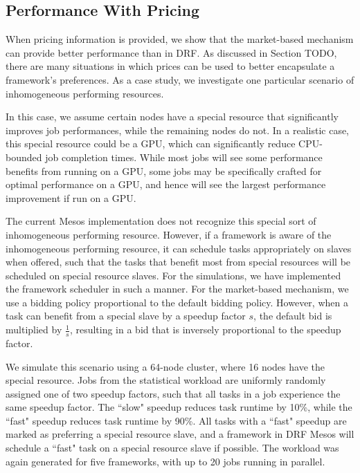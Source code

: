 \documentclass{acm_proc_article-sp}
\begin{document}
\subsection{Performance With Pricing\\}

When pricing information is provided, we show that the market-based mechanism can provide better performance than in DRF. As discussed in Section TODO, there are many situations in which prices can be used to better encapsulate a framework's preferences. As a case study, we investigate one particular scenario of inhomogeneous performing resources. 

In this case, we assume certain nodes have a special resource that significantly improves job performances, while the remaining nodes do not. In a realistic case, this special resource could be a GPU, which can significantly reduce CPU-bounded job completion times. While most jobs will see some performance benefits from running on a GPU, some jobs may be specifically crafted for optimal performance on a GPU, and hence will see the largest performance improvement if run on a GPU.

The current Mesos implementation does not recognize this special sort of inhomogeneous performing resource. However, if a framework is aware of the inhomogeneous performing resource, it can schedule tasks appropriately on slaves when offered, such that the tasks that benefit most from special resources will be scheduled on special resource slaves. For the simulations, we have implemented the framework scheduler in such a manner. For the market-based mechanism, we use a bidding policy proportional to the default bidding policy. However, when a task can benefit from a special slave by a speedup factor $s$, the default bid is multiplied by $\frac{1}{s}$, resulting in a bid that is inversely proportional to the speedup factor.

We simulate this scenario using a 64-node cluster, where 16 nodes have the special resource. Jobs from the statistical workload are uniformly randomly assigned one of two speedup factors, such that all tasks in a job experience the same speedup factor. The ``slow" speedup reduces task runtime by 10\%, while the ``fast" speedup reduces task runtime by 90\%. All tasks with a ``fast" speedup are marked as preferring a special resource slave, and a framework in DRF Mesos will schedule a ``fast" task on a special resource slave if possible. The workload was again generated for five frameworks, with up to 20 jobs running in parallel.
\end{document}
